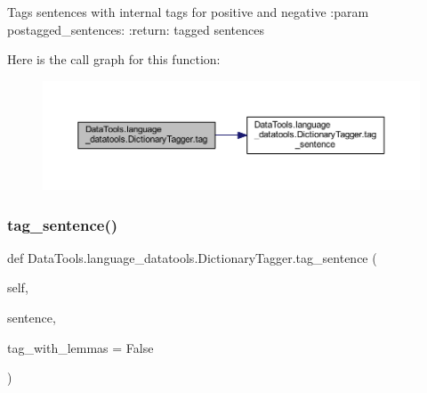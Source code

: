 \begin{DoxyVerb}    Tags sentences with internal tags for positive and negative
:param postagged_sentences:
:return: tagged sentences
\end{DoxyVerb}
 Here is the call graph for this function\+:
\nopagebreak
\begin{figure}[H]
\begin{center}
\leavevmode
\includegraphics[width=350pt]{class_data_tools_1_1language__datatools_1_1_dictionary_tagger_aa15c0e987509a72cb7ecc9c0a5ff39d7_cgraph}
\end{center}
\end{figure}
\mbox{\label{class_data_tools_1_1language__datatools_1_1_dictionary_tagger_ac5656960ce6b5a95d59cbc3df1b2332b}} 
\subsubsection{\texorpdfstring{tag\+\_\+sentence()}{tag\_sentence()}}
{\footnotesize\ttfamily def Data\+Tools.\+language\+\_\+datatools.\+Dictionary\+Tagger.\+tag\+\_\+sentence (\begin{DoxyParamCaption}\item[{}]{self,  }\item[{}]{sentence,  }\item[{}]{tag\+\_\+with\+\_\+lemmas = {\ttfamily False} }\end{DoxyParamCaption})}

